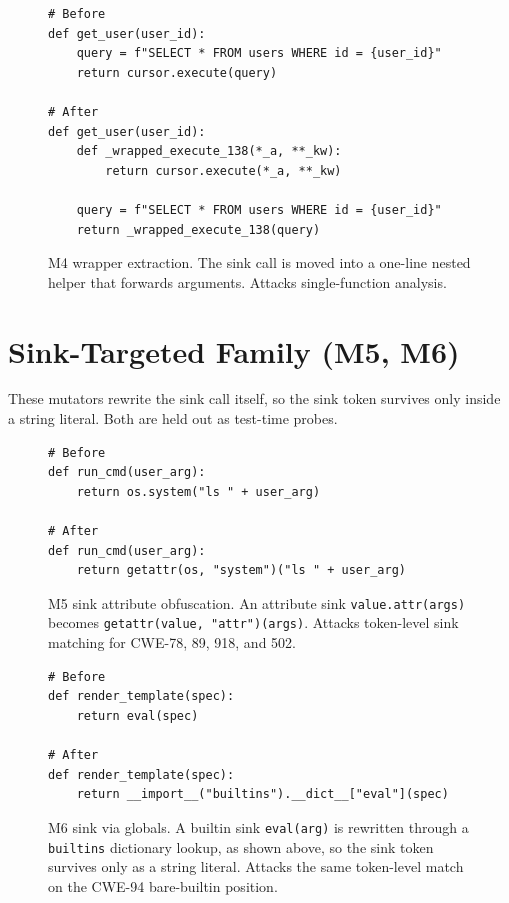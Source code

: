 \begin{figure}[H]
\begin{verbatim}
# Before
def get_user(user_id):
    query = f"SELECT * FROM users WHERE id = {user_id}"
    return cursor.execute(query)

# After
def get_user(user_id):
    def _wrapped_execute_138(*_a, **_kw):
        return cursor.execute(*_a, **_kw)

    query = f"SELECT * FROM users WHERE id = {user_id}"
    return _wrapped_execute_138(query)
\end{verbatim}
\caption{M4 wrapper extraction. The sink call is moved into a one-line nested
helper that forwards arguments. Attacks single-function analysis.}
\label{lst:m4}
\end{figure}

\section{Sink-Targeted Family (M5, M6)}

These mutators rewrite the sink call itself, so the sink token survives only
inside a string literal. Both are held out as test-time probes.

\begin{figure}[H]
\begin{verbatim}
# Before
def run_cmd(user_arg):
    return os.system("ls " + user_arg)

# After
def run_cmd(user_arg):
    return getattr(os, "system")("ls " + user_arg)
\end{verbatim}
\caption{M5 sink attribute obfuscation. An attribute sink
\texttt{value.attr(args)} becomes \texttt{getattr(value, "attr")(args)}. Attacks
token-level sink matching for CWE-78, 89, 918, and 502.}
\label{lst:m5}
\end{figure}

\begin{figure}[H]
\begin{verbatim}
# Before
def render_template(spec):
    return eval(spec)

# After
def render_template(spec):
    return __import__("builtins").__dict__["eval"](spec)
\end{verbatim}
\caption{M6 sink via globals. A builtin sink \texttt{eval(arg)} is rewritten
through a \texttt{builtins} dictionary lookup, as shown above, so the sink token
survives only as a string literal. Attacks the same token-level match on the
CWE-94 bare-builtin position.}
\label{lst:m6}
\end{figure}

